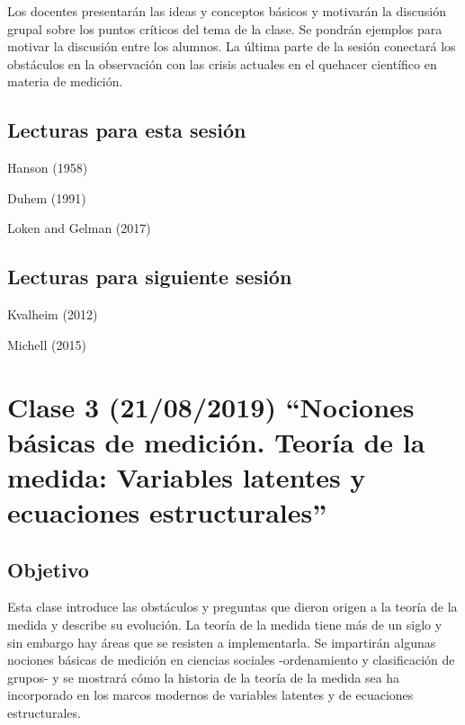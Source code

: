 \documentclass[11pt,]{article}
\begin{document}
Los docentes presentarán las ideas y conceptos básicos y motivarán la
discusión grupal sobre los puntos críticos del tema de la clase. Se
pondrán ejemplos para motivar la discusión entre los alumnos. La última
parte de la sesión conectará los obstáculos en la observación con las
crisis actuales en el quehacer científico en materia de medición.

\hypertarget{lecturas-para-esta-sesion}{%
\subsection{Lecturas para esta sesión}\label{lecturas-para-esta-sesion}}

Hanson (1958)

Duhem (1991)

Loken and Gelman (2017)

\hypertarget{lecturas-para-siguiente-sesion}{%
\subsection{Lecturas para siguiente
sesión}\label{lecturas-para-siguiente-sesion}}

Kvalheim (2012)

Michell (2015)

\hypertarget{clase-3-21082019-nociones-basicas-de-medicion.-teoria-de-la-medida-variables-latentes-y-ecuaciones-estructurales}{%
\section{Clase 3 (21/08/2019) ``Nociones básicas de medición. Teoría de
la medida: Variables latentes y ecuaciones
estructurales''}\label{clase-3-21082019-nociones-basicas-de-medicion.-teoria-de-la-medida-variables-latentes-y-ecuaciones-estructurales}}

\hypertarget{objetivo-2}{%
\subsection{Objetivo}\label{objetivo-2}}

Esta clase introduce las obstáculos y preguntas que dieron origen a la
teoría de la medida y describe su evolución. La teoría de la medida
tiene más de un siglo y sin embargo hay áreas que se resisten a
implementarla. Se impartirán algunas nociones básicas de medición en
ciencias sociales -ordenamiento y clasificación de grupos- y se mostrará
cómo la historia de la teoría de la medida sea ha incorporado en los
marcos modernos de variables latentes y de ecuaciones estructurales.
\end{document}
